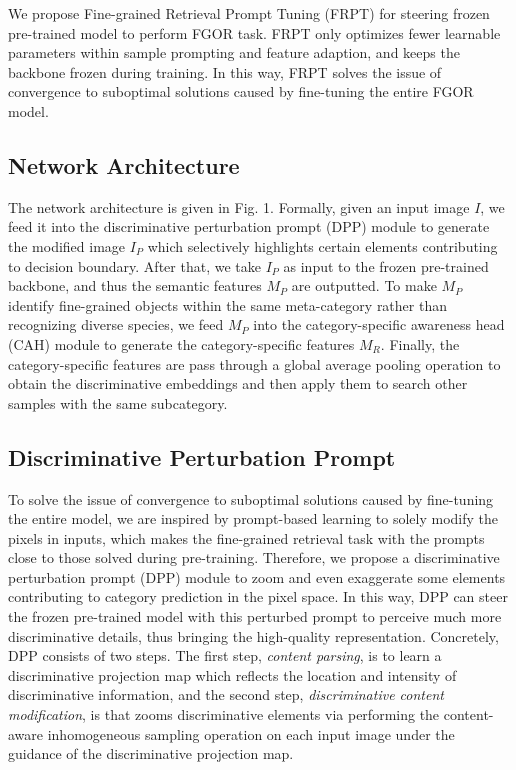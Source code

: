 \documentclass[letterpaper]{article} %
\begin{document}
We propose Fine-grained Retrieval Prompt Tuning (FRPT) for steering frozen pre-trained model to perform FGOR task. FRPT only optimizes fewer learnable parameters within sample prompting and feature adaption, and keeps the backbone frozen during training. In this way, FRPT solves the issue of convergence to suboptimal solutions caused by fine-tuning the entire FGOR model.



\subsection{Network Architecture}
The network architecture is given in Fig. 1.
Formally, given an input image $ I $, we feed it into the discriminative perturbation prompt (DPP) module to generate the modified image $ I_P $ which selectively highlights certain elements contributing to decision boundary. After that, we take $ I_P $ as input to the frozen pre-trained backbone, and thus the semantic features $ M_P $ are outputted.
To make $M_P$ identify fine-grained objects within the same meta-category rather than recognizing diverse species, we feed $ M_P $ into the category-specific awareness head (CAH) module to generate the category-specific features $ M_R $.  Finally, the category-specific features are pass through a global average pooling operation to obtain the discriminative embeddings and then apply them to search other samples with the same subcategory. %






\subsection{Discriminative Perturbation Prompt}
To solve the issue of convergence to suboptimal solutions caused by fine-tuning the entire model, we are inspired by prompt-based learning to solely modify the pixels in inputs, which makes the fine-grained retrieval task with the prompts close to those solved during pre-training.
Therefore, we propose a discriminative perturbation prompt (DPP) module to zoom and even exaggerate some elements contributing to category prediction in the pixel space. In this way, DPP can steer the frozen pre-trained model with this perturbed prompt to perceive much more discriminative details, thus bringing the high-quality representation.
Concretely, DPP consists of two steps. The first step, \textit{content parsing}, is to learn a discriminative projection map which reflects the location and intensity of discriminative information, and the second step, \textit{discriminative content modification}, is that zooms discriminative elements via performing the content-aware inhomogeneous sampling operation on each input image under the guidance of the discriminative projection map.
\end{document}
